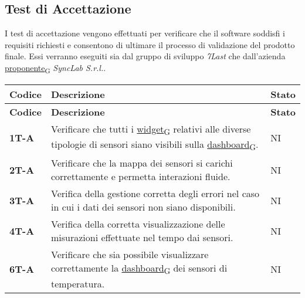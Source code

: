 \subsection{Test di Accettazione}
I test di accettazione vengono effettuati per verificare che il software soddisfi i requisiti richiesti e consentono di ultimare il processo di validazione del prodotto finale.
Essi verranno eseguiti sia dal gruppo di sviluppo \textit{7Last} che dall'azienda \href{https://7last.github.io/docs/rtb/documentazione-interna/glossario\#proponente}{proponente\textsubscript{G}} \textit{SyncLab S.r.l.}. \\
\begin{longtable}{|>{\raggedright\arraybackslash}m{}|>{\raggedright\arraybackslash}m{}|>{\raggedright\arraybackslash}m{}|}
	\hline
	\textbf{Codice} & \textbf{Descrizione}                                                                                                   & \textbf{Stato} \\
	\hline
	\endfirsthead
	\hline
	\textbf{Codice} & \textbf{Descrizione}                                                                                                   & \textbf{Stato} \\
	\endhead
	\textbf{1T-A}   & Verificare che tutti i \href{https://7last.github.io/docs/rtb/documentazione-interna/glossario\#widget}{widget\textsubscript{G}} relativi alle diverse tipologie di sensori siano visibili sulla \href{https://7last.github.io/docs/rtb/documentazione-interna/glossario\#dashboard}{dashboard\textsubscript{G}}.               & NI             \\
	\hline
	\textbf{2T-A}   & Verificare che la mappa dei sensori si carichi correttamente e permetta interazioni fluide.                            & NI             \\
	\hline
	\textbf{3T-A}   & Verifica della gestione corretta degli errori nel caso in cui i dati dei sensori non siano disponibili.                & NI             \\
	\hline
	\textbf{4T-A}   & Verifica della corretta visualizzazione delle misurazioni effettuate nel tempo dai sensori.                            & NI             \\
	\hline
	\textbf{6T-A}   & Verificare che sia possibile visualizzare correttamente la \href{https://7last.github.io/docs/rtb/documentazione-interna/glossario\#dashboard}{dashboard\textsubscript{G}} dei sensori di temperatura.                       & NI             \\

\end{longtable}
